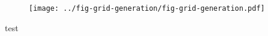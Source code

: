 \documentclass{article}
\begin{document}
\begin{figure}
	\centering
	\texttt{[image: ../fig-grid-generation/fig-grid-generation.pdf]}
\end{figure}
test
\end{document}
